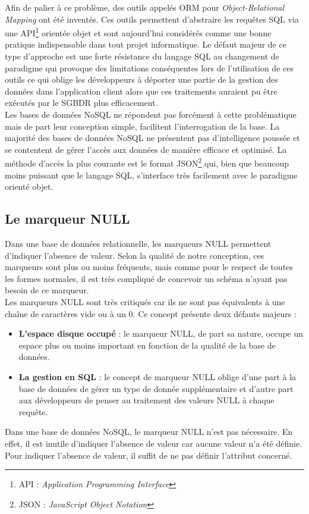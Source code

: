   Afin de palier à ce problème, des outils appelés ORM pour \textit{Object-Relational Mapping} ont été inventés. Ces outils permettent d'abstraire les requêtes SQL via une API\footnote{API : \textit{Application Programming Interface}} orientée objet et sont aujourd'hui considérés comme une bonne pratique indispensable dans tout projet informatique. Le défaut majeur de ce type d'approche est une forte résistance du langage SQL au changement de paradigme qui provoque des limitations conséquentes lors de l'utilisation de ces outils ce qui oblige les développeurs à déporter une partie de la gestion des données dans l'application client alors que ces traitements auraient pu être exécutés par le SGBDR plus efficacement.\\

  Les bases de données NoSQL ne répondent pas forcément à cette problématique mais de part leur conception simple, facilitent l'interrogation de la base. La majorité des bases de données NoSQL ne présentent pas d'intelligence poussée et se contentent de gérer l'accès aux données de manière efficace et optimisé. La méthode d'accès la plus courante est le format JSON\footnote{JSON : \textit{JavaScript Object Notation}} qui, bien que beaucoup moins puissant que le langage SQL, s'interface très facilement avec le paradigme orienté objet.


\subsection{Le marqueur NULL}
  Dans une base de données relationnelle, les marqueurs  NULL permettent d'indiquer l'absence de valeur. Selon la qualité de notre conception, ces marqueurs sont plus ou moins fréquents, mais comme pour le respect de toutes les formes normales, il est très compliqué de concevoir un schéma n'ayant pas besoin de ce marqueur.\\

  Les marqueurs NULL sont très critiqués car ils ne sont pas équivalents à une chaîne de caractères vide ou à un 0. Ce concept présente deux défauts majeurs :
  \vspace{10px}
  \begin{itemize}
    \item \textbf{L'espace disque occupé} : le marqueur NULL, de part sa nature, occupe un espace plus ou moins important en fonction de la qualité de la base de données.
    \item \textbf{La gestion en SQL} : le concept de marqueur NULL oblige d'une part à la base de données de gérer un type de donnée supplémentaire et d'autre part aux développeurs de penser au traitement des valeurs NULL à chaque requête.
  \end{itemize}
  \vspace{20px}

  Dans une base de données NoSQL, le marqueur NULL n'est pas nécessaire. En effet, il est inutile d'indiquer l'absence de valeur car aucune valeur n'a été définie. Pour indiquer l'absence de valeur, il suffit de ne pas définir l'attribut concerné.
